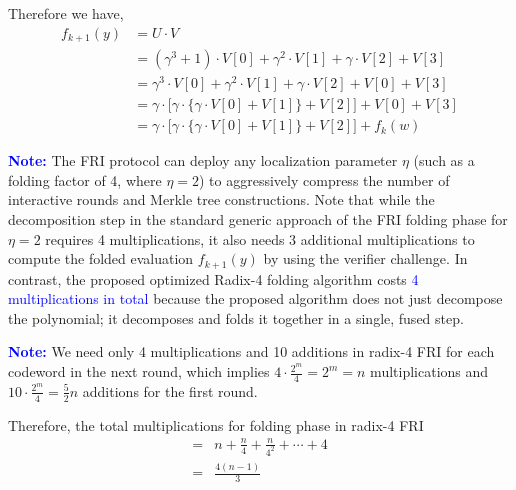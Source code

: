 \documentclass[11pt,runningheads]{llncs}
\begin{document}
Therefore we have, 
\begin{equation*}
    \begin{aligned}
        f_{k+1}(y)
        &= U\cdot V\\
        &= 
        (\gamma^3+1)\cdot V[0]+ \gamma^2 \cdot V[1]+ \gamma \cdot V[2]+ V[3]\\
        &= \gamma^3 \cdot V[0]+ \gamma^2 \cdot V[1]+ \gamma \cdot V[2] + V[0]+V[3]\\
        &= \gamma \cdot \Big[ \gamma \cdot \big\{\gamma \cdot V[0] + V[1] \big\} + V[2] \Big] + V[0]+V[3]\\
        &= \gamma \cdot \Big[ \gamma \cdot \big\{\gamma \cdot V[0] + V[1] \big\} + V[2] \Big] + f_{k}(w)
    \end{aligned}
\end{equation*}
\vspace{1em}

\noindent \textbf{\textcolor{blue}{Note:}} The FRI protocol can deploy any localization parameter $\eta$ (such as a folding factor of 4, where $\eta=2$) to aggressively compress the number of interactive rounds and Merkle tree constructions. Note that while the decomposition step in the standard generic approach of the FRI folding phase for $\eta=2$ requires 4 multiplications, it also needs 3 additional multiplications to compute the folded evaluation $f_{k+1}(y)$ by using the verifier challenge. In contrast, the proposed optimized Radix-4 folding algorithm costs \textcolor{blue}{4 multiplications in total} because the proposed algorithm does not just decompose the polynomial; it decomposes and folds it together in a single, fused step.

\vspace{1em}

\noindent \textbf{\textcolor{blue}{Note:}} We need only 4 multiplications and 10 additions in radix-4 FRI for each codeword in the next round, which implies $4\cdot \frac{2^m}{4}=2^m=n$ multiplications and $10\cdot \frac{2^m}{4}=\frac{5}{2}n$ additions for the first round.

Therefore, the total multiplications for folding phase in radix-4 FRI
\begin{equation*}
    \begin{aligned}
        =& n + \frac{n}{4}+ \frac{n}{4^2}+ \cdots + 4\\
        =& \frac{4(n-1)}{3}
    \end{aligned}
\end{equation*}
\end{document}
